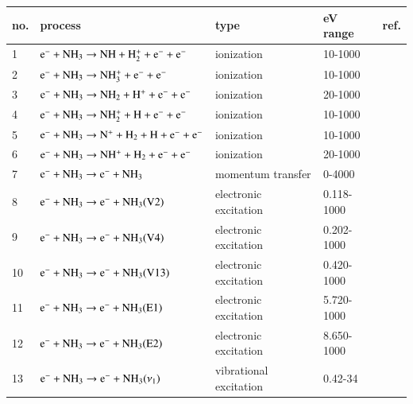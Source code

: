 \begin{table}
  \center{}
  \begin{threeparttable}
    \label{tab:tableNH3}
    \begin{tabular*}{\textwidth}{l@{\extracolsep{\fill}}llll}
    \toprule
    {no.}  & {process} & {type} &  {eV range}  &  {ref.} \\
    \midrule
      1 & $\rm e^- + NH_3 \rightarrow NH + H_2^+ + e^- + e^-$  &  ionization   &  10-1000 &  \cite{psst:2023:snoeckx} \\
      2 & $\rm e^- + NH_3 \rightarrow NH_3^+ + e^- + e^-$  &  ionization   &  10-1000  & \cite{psst:2023:snoeckx}\\
      3 & $\rm e^- + NH_3 \rightarrow NH_2 + H^+ + e^- + e^-$  &  ionization   &  20-1000   &\cite{psst:2023:snoeckx}\\
      4 & $\rm e^- + NH_3 \rightarrow NH_2^+ + H + e^- + e^-$  &  ionization   &  10-1000  & \cite{psst:2023:snoeckx}\\      
      5 & $\rm e^- + NH_3 \rightarrow N^+ + H_2 + H + e^- + e^-$  &  ionization   &  10-1000   &\cite{psst:2023:snoeckx}\\         
      6 & $\rm e^- + NH_3 \rightarrow NH^+ + H_2 +  e^- + e^-$  &  ionization   &  20-1000   &\cite{psst:2023:snoeckx}\\  
      \midrule     
      7 & $\rm e^- + NH_3 \rightarrow e^- + NH_3$  &  momentum transfer   &  0-4000  & \cite{lxc:2024:morgan}\\   
      \midrule
      8 & $\rm e^- + NH_3 \rightarrow e^- + NH_3(V2)$  &  electronic excitation   &  0.118-1000 & \cite{lxc:2024:morgan}\\ 
      9 & $\rm e^- + NH_3 \rightarrow e^- + NH_3(V4)$  &  electronic excitation   &  0.202-1000 &\cite{lxc:2024:morgan}\\  
      10 & $\rm e^- + NH_3 \rightarrow e^- + NH_3(V13)$  &  electronic excitation   &  0.420-1000 &\cite{lxc:2024:morgan}\\  
      11 & $\rm e^- + NH_3 \rightarrow e^- + NH_3(E1)$  &  electronic excitation   &  5.720-1000 &\cite{lxc:2024:morgan}\\ 
      12 & $\rm e^- + NH_3 \rightarrow e^- + NH_3(E2)$  &  electronic excitation   &  8.650-1000 &\cite{lxc:2024:morgan}\\ 
      \midrule
      13 & $\rm e^- + NH_3 \rightarrow e^- + NH_3(\nu_1)$  &  vibrational excitation   &  0.42-34 &\cite{psst:2023:snoeckx}\\  

\end{tabular*}
\end{threeparttable}
\end{table}
